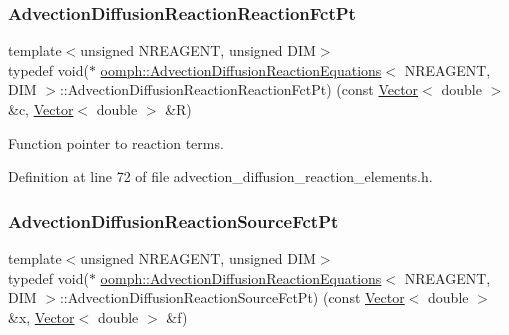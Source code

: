 \mbox{\label{classoomph_1_1AdvectionDiffusionReactionEquations_a74f8f0492147a5600b075cc64479f850}} 
\subsubsection{\texorpdfstring{Advection\+Diffusion\+Reaction\+Reaction\+Fct\+Pt}{AdvectionDiffusionReactionReactionFctPt}}
{\footnotesize\ttfamily template$<$unsigned N\+R\+E\+A\+G\+E\+NT, unsigned D\+IM$>$ \\
typedef void($\ast$ \hyperlink{classoomph_1_1AdvectionDiffusionReactionEquations}{oomph\+::\+Advection\+Diffusion\+Reaction\+Equations}$<$ N\+R\+E\+A\+G\+E\+NT, D\+IM $>$\+::Advection\+Diffusion\+Reaction\+Reaction\+Fct\+Pt) (const \hyperlink{classoomph_1_1Vector}{Vector}$<$ double $>$ \&c, \hyperlink{classoomph_1_1Vector}{Vector}$<$ double $>$ \&R)}



Function pointer to reaction terms. 



Definition at line 72 of file advection\+\_\+diffusion\+\_\+reaction\+\_\+elements.\+h.

\mbox{\label{classoomph_1_1AdvectionDiffusionReactionEquations_a3443e579e62414ecc50595403982e686}} 
\subsubsection{\texorpdfstring{Advection\+Diffusion\+Reaction\+Source\+Fct\+Pt}{AdvectionDiffusionReactionSourceFctPt}}
{\footnotesize\ttfamily template$<$unsigned N\+R\+E\+A\+G\+E\+NT, unsigned D\+IM$>$ \\
typedef void($\ast$ \hyperlink{classoomph_1_1AdvectionDiffusionReactionEquations}{oomph\+::\+Advection\+Diffusion\+Reaction\+Equations}$<$ N\+R\+E\+A\+G\+E\+NT, D\+IM $>$\+::Advection\+Diffusion\+Reaction\+Source\+Fct\+Pt) (const \hyperlink{classoomph_1_1Vector}{Vector}$<$ double $>$ \&x, \hyperlink{classoomph_1_1Vector}{Vector}$<$ double $>$ \&f)}



